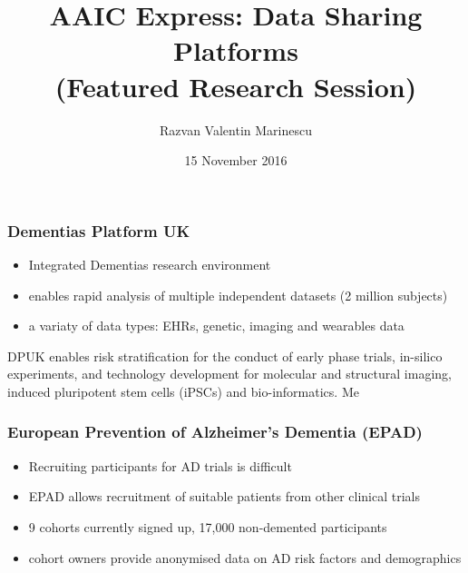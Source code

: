 \documentclass[10pt,xcolor=table]{beamer}
\title{AAIC Express: Data Sharing Platforms \\(Featured Research Session)}
\author{Razvan Valentin Marinescu}
\date{15 November 2016}
\begin{document}
 
\frame{\titlepage}
 




\begin{frame}
\frametitle{Dementias Platform UK}

\begin{itemize}
\item Integrated Dementias research environment
\item enables rapid analysis of multiple independent datasets (2 million subjects)
\item a variaty of data types: EHRs, genetic, imaging and wearables data

\end{itemize}


DPUK enables risk stratification for the conduct of early phase trials, in-silico experiments, and technology development for molecular and structural imaging, induced pluripotent stem cells (iPSCs) and bio-informatics. Me

\end{frame}

\begin{frame}
\frametitle{European Prevention of Alzheimer’s Dementia (EPAD)}

\begin{itemize}
 \item Recruiting participants for AD trials is difficult
 \item EPAD allows recruitment of suitable patients from other clinical trials
 \item 9 cohorts currently signed up, 17,000 non-demented participants
 \item cohort owners provide anonymised data on AD risk factors and demographics
\end{itemize}


\end{frame}
\end{document}
